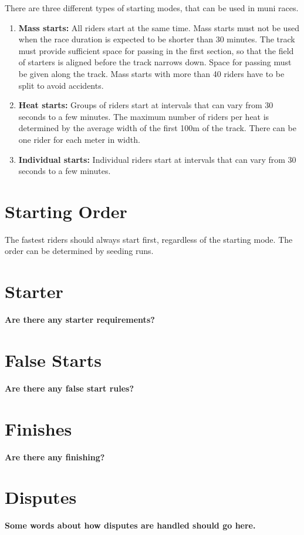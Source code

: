 There are three different types of starting modes, that can be used in muni races.
\begin{enumerate}
\item \textbf{Mass starts:} All riders start at the same time.
Mass starts must not be used when the race duration is expected to be shorter than 30 minutes.
The track must provide sufficient space for passing in the first section, so that the field of starters is aligned before the track narrows down.
Space for passing must be given along the track.
Mass starts with more than 40 riders have to be split to avoid accidents.
\item \textbf{Heat starts:} Groups of riders start at intervals that can vary from 30 seconds to a few minutes.
The maximum number of riders per heat is determined by the average width of the first 100m of the track.
There can be one rider for each meter in width.
\item \textbf{Individual starts:} Individual riders start at intervals that can vary from 30 seconds to a few minutes.
\end{enumerate}

\section{Starting Order}

The fastest riders should always start first, regardless of the starting mode.
The order can be determined by seeding runs.


\section{Starter}

\textbf{Are there any starter requirements?}

\section{False Starts}

\textbf{Are there any false start rules?}

\section{Finishes}

\textbf{Are there any finishing?}

\section{Disputes}

\textbf{Some words about how disputes are handled should go here.}

